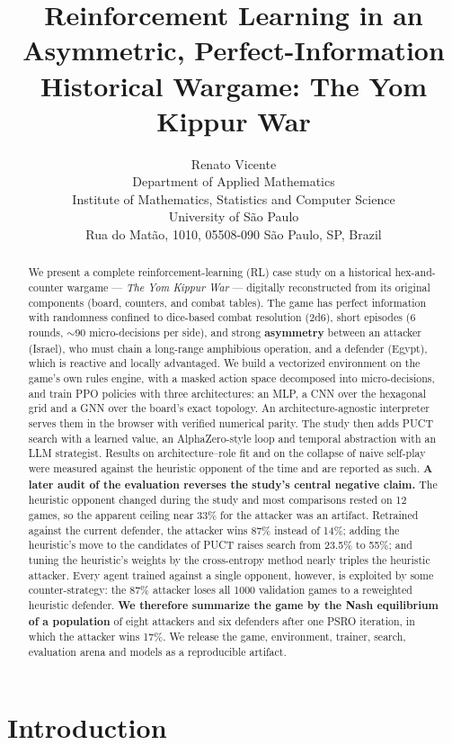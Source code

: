 \documentclass{article}
\title{Reinforcement Learning in an Asymmetric, Perfect-Information
Historical Wargame: The Yom Kippur War}
\author{%
  Renato Vicente \\
  Department of Applied Mathematics \\
  Institute of Mathematics, Statistics and Computer Science \\
  University of S\~{a}o Paulo \\
  Rua do Mat\~{a}o, 1010, 05508-090 S\~{a}o Paulo, SP, Brazil
}
\begin{document}
\maketitle

\begin{abstract}
We present a complete reinforcement-learning (RL) case study on a historical
hex-and-counter wargame --- \emph{The Yom Kippur War} --- digitally reconstructed from
its original components (board, counters, and combat tables). The game has perfect
information with randomness confined to dice-based combat resolution (2d6), short
episodes (6 rounds, $\sim$90 micro-decisions per side), and strong \textbf{asymmetry}
between an attacker (Israel), who must chain a long-range amphibious operation, and a
defender (Egypt), which is reactive and locally advantaged. We build a vectorized
environment on the game's own rules engine, with a masked action space decomposed into
micro-decisions, and train PPO policies with three architectures: an MLP, a CNN over the
hexagonal grid and a GNN over the board's exact topology. An architecture-agnostic
interpreter serves them in the browser with verified numerical parity. The study then
adds PUCT search with a learned value, an AlphaZero-style loop and temporal abstraction
with an LLM strategist. Results on architecture--role fit and on the collapse of naive self-play
were measured against the heuristic opponent of the time and are reported as such.
\textbf{A later audit of the evaluation reverses the study's central negative claim.}
The heuristic opponent changed during the study and most comparisons rested on 12
games, so the apparent ceiling near 33\% for the attacker was an artifact. Retrained
against the current defender, the attacker wins 87\% instead of 14\%; adding the
heuristic's move to the candidates of PUCT raises search from 23.5\% to 55\%; and tuning
the heuristic's weights by the cross-entropy method nearly triples the heuristic
attacker. Every agent trained against a single opponent, however, is exploited by some
counter-strategy: the 87\% attacker loses all 1000 validation games to a reweighted
heuristic defender. \textbf{We therefore summarize the game by the Nash equilibrium of a
population} of eight attackers and six defenders after one PSRO iteration, in which the
attacker wins 17\%. We release the game, environment, trainer, search, evaluation arena
and models as a reproducible artifact.
\end{abstract}

\section{Introduction}
\end{document}
